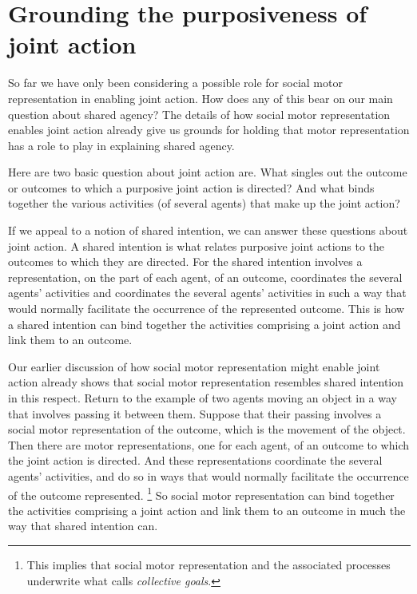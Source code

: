 \documentclass[12pt,\papersize]{extarticle}
\begin{document}
\section{Grounding the purposiveness of joint action}
So far we have only been considering a possible role for social motor representation in enabling joint action.  
How does any of this bear on our main question about shared agency?
The details of how 
social motor representation enables joint action
 already give us grounds for holding that motor representation has a role to play in explaining shared agency.

Here are two basic question about  joint action are.
What singles out the outcome or outcomes to which a purposive joint action is directed?
And what binds together the various activities (of several agents) that make up the joint action?

If we appeal to a notion of shared intention,
we can answer these questions about joint action.
A shared intention is what relates purposive joint actions to the outcomes to which they are directed.
For the shared intention 
involves a representation, on the part of each agent, of an outcome,
coordinates the several agents’ activities
and 
coordinates the several agents’ activities in such a way that would normally facilitate the occurrence of the represented outcome.
This is how a shared intention can bind together the activities comprising a joint action and link them to an outcome.


Our earlier discussion of how social motor representation might enable joint action already shows that social motor representation resembles shared intention in this respect.
Return to the example of two agents moving an object in a way that involves passing it between them.
Suppose that their passing involves a social motor representation of the outcome,
which is the movement of the object. 
Then there are motor representations, one for each agent, 
of an outcome to which the joint action is directed.
And these representations coordinate the several agents' activities,
and 
do so in ways that would normally facilitate the occurrence of the  outcome represented.%
\footnote{
This implies that social motor representation and the associated processes underwrite what \citet{Butterfill:2011_wija} calls \textit{collective goals}.
}
So social motor representation can bind together the activities comprising a joint action and link them to an outcome in much the way that shared intention can.
\end{document}
